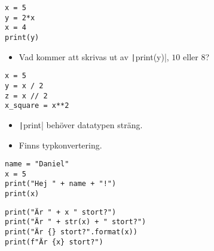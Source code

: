 \begin{frame}[fragile]
  \begin{example}
    \begin{verbatim}
x = 5
y = 2*x
x = 4
print(y)
    \end{verbatim}
  \end{example}

  \begin{exercise}
    \begin{itemize}
      \item Vad kommer att skrivas ut av \texttt|print(y)|,
        \(10\) eller \(8\)?
    \end{itemize}
  \end{exercise}
\end{frame}

\begin{frame}[fragile]
  \begin{example}
    \begin{verbatim}
x = 5
y = x / 2
z = x // 2
x_square = x**2
    \end{verbatim}
  \end{example}
\end{frame}

\begin{frame}[fragile]
  \begin{remark}
    \begin{itemize}
      \item \texttt|print| behöver datatypen sträng.
      \item Finns typkonvertering.
    \end{itemize}
  \end{remark}

  \begin{example}
    \begin{verbatim}
name = "Daniel"
x = 5
print("Hej " + name + "!")
print(x)
    \end{verbatim}
  \end{example}
\end{frame}

\begin{frame}[fragile]
  \begin{example}
    \begin{verbatim}
print("Är " + x " stort?")
print("Är " + str(x) + " stort?")
print("Är {} stort?".format(x))
print(f"Är {x} stort?")
    \end{verbatim}
  \end{example}
\end{frame}


